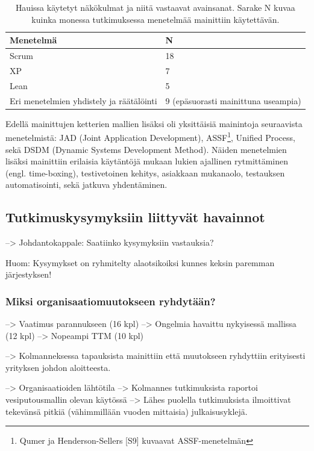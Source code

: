 \begin{table}[h]
    \begin{tabular}{|l|l|}
        \hline
        Menetelmä       & N   \\ \hline
        Scrum           & 18 \\ 
        XP              & 7 \\
        Lean            & 5 \\
        Eri menetelmien yhdistely ja räätälöinti & 9  (epäsuorasti mainittuna useampia) \\
        \hline
    \end{tabular}
	\caption{Hauissa käytetyt näkökulmat ja niitä vastaavat avainsanat. Sarake N
	kuvaa kuinka monessa tutkimuksessa menetelmää mainittiin käytettävän.}
	\label{table:practices}
\end{table}

Edellä mainittujen ketterien mallien lisäksi oli yksittäisiä mainintoja
seuraavista menetelmistä: JAD (Joint Application Development),
ASSF\footnote{Qumer ja Henderson-Sellers [S9] kuvaavat ASSF-menetelmän}, Unified Process, sekä DSDM
(Dynamic Systems Development Method). Näiden menetelmien lisäksi mainittiin
erilaisia käytäntöjä mukaan lukien ajallinen rytmittäminen (engl. time-boxing),
testivetoinen kehitys, asiakkaan mukanaolo, testauksen automatisointi, sekä
jatkuva yhdentäminen.

\subsection{Tutkimuskysymyksiin liittyvät havainnot}

--> Johdantokappale: Saatiinko kysymyksiin vastauksia?

Huom: Kysymykset on ryhmitelty alaotsikoiksi kunnes keksin paremman järjestyksen!
 
\subsubsection{Miksi organisaatiomuutokseen ryhdytään?}

--> Vaatimus parannukseen (16 kpl)
--> Ongelmia havaittu nykyisessä mallissa (12 kpl)
--> Nopeampi TTM (10 kpl)

--> Kolmanneksessa tapauksista mainittiin että muutokseen ryhdyttiin erityisesti
yrityksen johdon aloitteesta.

--> Organisaatioiden lähtötila
--> Kolmannes tutkimuksista raportoi vesiputousmallin olevan käytössä
--> Lähes puolella tutkimuksista ilmoittivat tekevänsä pitkiä (vähimmillään
vuoden mittaisia) julkaisusyklejä.


